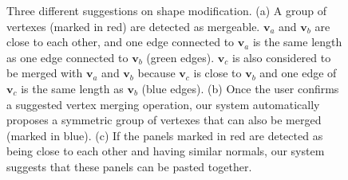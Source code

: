 \begin{figure}
	\centering
	\hfill
	\hfill
	
	\caption{Three different suggestions on shape modification. (a) A group of vertexes (marked in red) are detected as mergeable. $\mathbf{v}_a$ and $\mathbf{v}_b$ are close to each other, and one edge connected to $\mathbf{v}_a$ is the same length as one edge connected to $\mathbf{v}_b$ (green edges). $\mathbf{v}_c$ is also considered to be merged with $\mathbf{v}_a$ and $\mathbf{v}_b$ because $\mathbf{v}_c$ is close to $\mathbf{v}_b$ and one edge of $\mathbf{v}_c$ is the same length as $\mathbf{v}_b$ (blue edges). (b) Once the user confirms a suggested vertex merging operation, our system automatically proposes a symmetric group of vertexes that can also be merged (marked in blue). (c) If the panels marked in red are detected as being close to each other and having similar normals, our system suggests that these panels can be pasted together.}
	\label{fig:suggestion}
\end{figure}

 
